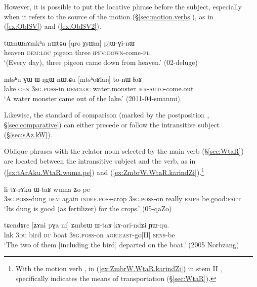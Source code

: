 However, it is possible to put the locative phrase before the subject, especially when it refers to the source of the motion (§\ref{sec:motion.verbs}), as in (\ref{ex:OblSV}) and (\ref{ex:OblSV2}).

\begin{exe}
\ex \label{ex:OblSV}
\gll tɯmɯnɤmkʰa nɯtɕu [qro χsɯm] pjɯ-ɣi-nɯ \\
heaven \textsc{dem}:\textsc{loc} pigeon three \textsc{ipfv}:\textsc{down}-come-\textsc{pl} \\
\glt `(Every day), three pigeon came down from heaven.' (02-deluge)
\end{exe}

\begin{exe}
\ex \label{ex:OblSV2}
\gll mtsʰu ɣɯ ɯ-ŋgɯ nɯtɕu [mtsʰoʁlaŋ] to-nɯ-ɬoʁ  \\
lake \textsc{gen} \textsc{3sg}.\textsc{poss}-in \textsc{dem}:\textsc{loc} water.monster \textsc{ifr}-\textsc{auto}-come.out \\
\glt `A water monster came out of the lake.' (2011-04-smanmi)
\end{exe}

Likewise, the standard of comparison (marked by the postposition , §\ref{sec:comparative}) can either precede or follow the intransitive subject (§\ref{sec:sAz.kW}).

Oblique phrases with the relator noun  selected by the main verb (§\ref{sec:WtaR}) are located between the intransitive subject and the verb, as in (\ref{ex:tArAku.WtaR.wuma.pe}) and (\ref{ex:ZmbrW.WtaR.karindZi}).\footnote{
With the motion verb , in (\ref{ex:ZmbrW.WtaR.karindZi}) in stem II ,  specifically indicates the means of transportation (§\ref{sec:WtaR}). }

\begin{exe}
\ex \label{ex:tArAku.WtaR.wuma.pe}
\gll  [ɯ-ɣli nɯ] li tɤ-rɤku ɯ-taʁ wuma ʑo pe \\
\textsc{3sg}.\textsc{poss}-dung \textsc{dem} again \textsc{indef}.\textsc{poss}-crop \textsc{3sg}.\textsc{poss}-on really \textsc{emph} be.good:\textsc{fact} \\
\glt `Its dung is good (as fertilizer) for the crops.' (05-qaZo) 
\end{exe}

\begin{exe}
\ex \label{ex:ZmbrW.WtaR.karindZi}
\gll tɕendɤre [ʑɤni pɣa ni] ʑmbrɯ ɯ-taʁ kɤ-ari-ndʑi ɲɯ-ŋu. \\
lnk \textsc{3du} bird \textsc{du} boat \textsc{3sg}.\textsc{poss}-on \textsc{aor}:\textsc{east}-go[II] \textsc{sens}-be \\
\glt `The two of them [including the bird] departed on the boat.' (2005 Norbzang)
\end{exe} 

